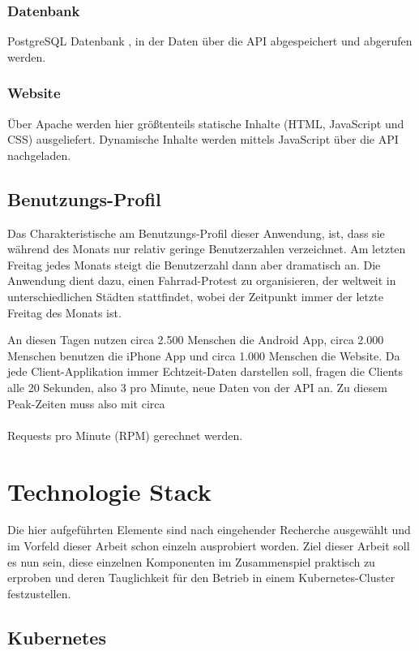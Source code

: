 \subsubsection{Datenbank}
PostgreSQL Datenbank \cite{postgresql}, in der Daten über die API abgespeichert und abgerufen werden.

\subsubsection{Website}
Über Apache werden hier größtenteils statische Inhalte (HTML, JavaScript und
CSS) ausgeliefert.
Dynamische Inhalte werden mittels JavaScript über die API nachgeladen.

\subsection{Benutzungs-Profil}
Das Charakteristische am Benutzungs-Profil dieser Anwendung,
ist, dass sie während des Monats nur relativ geringe Benutzerzahlen verzeichnet.
Am letzten
Freitag jedes Monats steigt die Benutzerzahl dann aber dramatisch an.
Die Anwendung dient dazu, einen Fahrrad-Protest zu organisieren,
der weltweit in unterschiedlichen Städten stattfindet, wobei der Zeitpunkt immer
der letzte Freitag des Monats ist.

An diesen Tagen nutzen circa 2.500 Menschen die Android App, circa 2.000 Menschen benutzen die iPhone App
und circa 1.000 Menschen die Website.
Da jede Client-Applikation immer Echtzeit-Daten darstellen soll, fragen die Clients
alle 20 Sekunden, also 3 pro Minute, neue Daten von der API an.
Zu diesem Peak-Zeiten muss also mit circa
\\ \\Requests pro Minute (RPM) gerechnet werden.

\section{Technologie Stack}

Die hier aufgeführten Elemente sind nach eingehender Recherche ausgewählt und im
Vorfeld dieser Arbeit schon einzeln ausprobiert worden.
Ziel dieser Arbeit soll es nun sein, diese einzelnen Komponenten im Zusammenspiel
praktisch zu erproben und deren Tauglichkeit für den Betrieb in einem
Kubernetes-Cluster festzustellen.

\subsection{Kubernetes}

